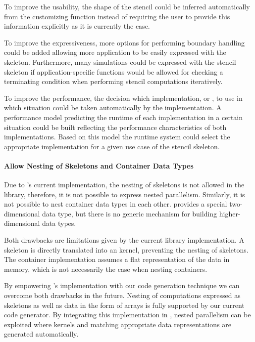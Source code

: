 To improve the usability, the shape of the stencil could be inferred automatically from the customizing function instead of requiring the user to provide this information explicitly as it is currently the case.

To improve the expressiveness, more options for performing boundary handling could be added allowing more application to be easily expressed with the skeleton.
Furthermore, many simulations could be expressed with the stencil skeleton if application-specific functions would be allowed for checking a terminating condition when performing stencil computations iteratively.

To improve the performance, the decision which implementation,  or , to use in which situation could be taken automatically by the \SkelCL implementation.
A performance model predicting the runtime of each implementation in a certain situation could be built reflecting the performance characteristics of both implementations.
Based on this model the runtime system could select the appropriate implementation for a given use case of the stencil skeleton.


\paragraph{Allow Nesting of Skeletons and Container Data Types}
Due to \SkelCL's current implementation, the nesting of skeletons is not allowed in the library, therefore, it is not possible to express nested parallelism.
Similarly, it is not possible to nest container data types in each other.
\SkelCL provides a special two-dimensional data type, but there is no generic mechanism for building higher-dimensional data types.

Both drawbacks are limitations given by the current library implementation.
A skeleton is directly translated into an \OpenCL kernel, preventing the nesting of skeletons.
The container implementation assumes a flat representation of the data in memory, which is not necessarily the case when nesting containers.

By empowering \SkelCL's implementation with our code generation technique we can overcome both drawbacks in the future.
Nesting of computations expressed as skeletons as well as data in the form of arrays is fully supported by our current code generator.
By integrating this implementation in \SkelCL, nested parallelism can be exploited where \OpenCL kernels and matching appropriate data representations are generated automatically.

